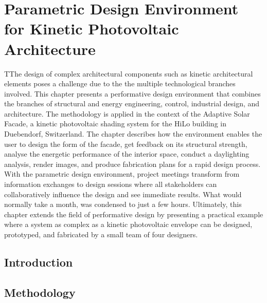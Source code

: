 
\chapter{Parametric Design Environment for Kinetic Photovoltaic Architecture}
\label{ch:asfDesign}


\begin{chapterabstract}
TThe design of complex architectural components such as kinetic architectural elements poses a challenge due to the the multiple technological branches involved. This chapter presents a performative design environment that combines the branches of structural and energy engineering, control, industrial design, and architecture. The methodology is applied in the context of the Adaptive Solar Facade, a kinetic photovoltaic shading system for the HiLo building in Duebendorf, Switzerland. The chapter describes how the environment enables the user to design the form of the facade, get feedback on its structural strength, analyse the energetic performance of the interior space, conduct a daylighting analysis, render images, and produce fabrication plans for a rapid design process. With the parametric design environment, project meetings transform from information exchanges to design sessions where all stakeholders can collaboratively influence the design and see immediate results. What would normally take a month, was condensed to just a few hours. Ultimately, this chapter extends the field of performative design by presenting a practical example where a system as complex as a kinetic photovoltaic envelope can be designed, prototyped, and fabricated by a small team of four designers. 
\end{chapterabstract}


\newpage

\graphicspath{{chapters/ch1asfDesign//Images/}}

\section{Introduction}
\label{ch:introduction1}


\section{Methodology}
\label{ch:method1}


